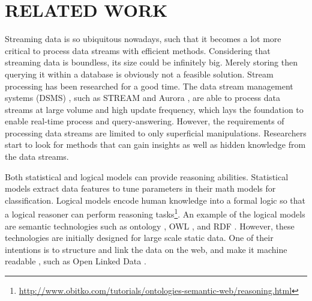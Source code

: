 
\chapter{RELATED WORK}
Streaming data is so ubiquitous nowadays, such that it becomes a lot more critical to process data streams with efficient methods.
Considering that streaming data is boundless, its size could be infinitely big. 
Merely storing then querying it within a database is obviously not a feasible solution.
Stream processing \cite{stephens1997survey} has been researched for a good time.
The data stream management systems (DSMS) \cite{cugola2012processing}, such as STREAM \cite{arasu2003stream} and Aurora \cite{abadi2003aurora}, are able to process data streams at large volume and high update frequency, which lays the foundation to enable real-time process and query-answering. 
However, the requirements of processing data streams are limited to only superficial manipulations.
Researchers start to look for methods that can gain insights as well as hidden knowledge from the data streams.

Both statistical and logical models can provide reasoning abilities. 
Statistical models extract data features to tune parameters in their math models for classification. 
Logical models encode human knowledge into a formal logic so that a logical reasoner can perform reasoning tasks\footnote{\url{http://www.obitko.com/tutorials/ontologies-semantic-web/reasoning.html}}.
An example of the logical models are semantic technologies such as ontology \cite{noy2001ontology}, OWL \cite{bechhofer2009owl}, and RDF \cite{lassila1999resource}.
However, these technologies are initially designed for large scale static data.
One of their intentions is to structure and link the data on the web, and make it machine readable \cite{berners2001semantic}, such as Open Linked Data \cite{bizer2009linked}.

